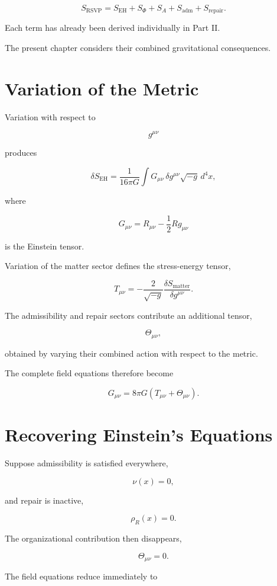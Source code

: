 \documentclass[11pt,oneside]{book}
\numberwithin{equation}{chapter}
\theoremstyle{definition}
\theoremstyle{plain}
\begin{document}
\[
S_{\mathrm{RSVP}}
=
S_{\mathrm{EH}}
+
S_{\Phi}
+
S_A
+
S_{\mathrm{adm}}
+
S_{\mathrm{repair}}.
\]

Each term has already been derived individually in Part II.

The present chapter considers their combined gravitational consequences.

\section{Variation of the Metric}

Variation with respect to

\[
g^{\mu\nu}
\]

produces

\[
\delta
S_{\mathrm{EH}}
=
\frac{1}{16\pi G}
\int
G_{\mu\nu}
\,
\delta g^{\mu\nu}
\sqrt{-g}\,
d^4x,
\]

where

\[
G_{\mu\nu}
=
R_{\mu\nu}
-
\frac12
Rg_{\mu\nu}
\]

is the Einstein tensor.

Variation of the matter sector defines the stress-energy tensor,

\[
T_{\mu\nu}
=
-
\frac{2}{\sqrt{-g}}
\frac{\delta S_{\mathrm{matter}}}
{\delta g^{\mu\nu}}.
\]

The admissibility and repair sectors contribute an additional tensor,

\[
\Theta_{\mu\nu},
\]

obtained by varying their combined action with respect to the metric.

The complete field equations therefore become

\[
\boxed{
G_{\mu\nu}
=
8\pi G
\left(
T_{\mu\nu}
+
\Theta_{\mu\nu}
\right).
}
\]

\section{Recovering Einstein's Equations}

Suppose admissibility is satisfied everywhere,

\[
\nu(x)=0,
\]

and repair is inactive,

\[
\rho_R(x)=0.
\]

The organizational contribution then disappears,

\[
\Theta_{\mu\nu}=0.
\]

The field equations reduce immediately to
\end{document}
